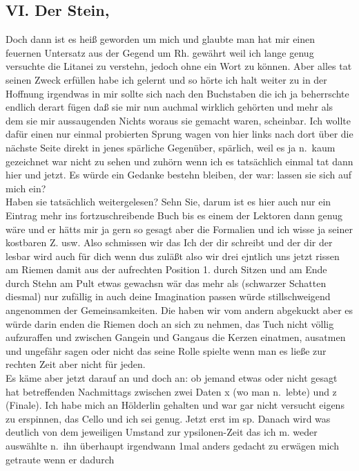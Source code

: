 \documentclass[
]{article}
\author{}
\date{\vspace{-2.5em}}
\begin{document}
\subsection{VI. Der Stein,}\label{vi.-der-stein}

Doch dann ist es heiß geworden um mich und glaubte man hat mir einen
feuernen Untersatz aus der Gegend um Rh. gewährt weil ich lange genug
versuchte die Litanei zu verstehn, jedoch ohne ein Wort zu können. Aber
alles tat seinen Zweck erfüllen habe ich gelernt und so hörte ich halt
weiter zu in der Hoffnung irgendwas in mir sollte sich nach den
Buchstaben die ich ja beherrschte endlich derart fügen daß sie mir nun
auchmal wirklich gehörten und mehr als dem sie mir aussaugenden Nichts
woraus sie gemacht waren, scheinbar. Ich wollte dafür einen nur einmal
probierten Sprung wagen von hier links nach dort über die nächste Seite
direkt in jenes spärliche Gegenüber, spärlich, weil es ja n.~kaum
gezeichnet war nicht zu sehen und zuhörn wenn ich es tatsächlich einmal
tat dann hier und jetzt. Es würde ein Gedanke bestehn bleiben, der war:
lassen sie sich auf mich ein?\\
Haben sie tatsächlich weitergelesen? Sehn Sie, darum ist es hier auch
nur ein Eintrag mehr ins fortzuschreibende Buch bis es einem der
Lektoren dann genug wäre und er hätts mir ja gern so gesagt aber die
Formalien und ich wisse ja seiner kostbaren Z. usw. Also schmissen wir
das Ich der dir schreibt und der dir der lesbar wird auch für dich wenn
dus zuläßt also wir drei ejntlich uns jetzt rissen am Riemen damit aus
der aufrechten Position 1. durch Sitzen und am Ende durch Stehn am Pult
etwas gewachsn wär das mehr als (schwarzer Schatten diesmal) nur
zufällig in auch deine Imagination passen würde stillschweigend
angenommen der Gemeinsamkeiten. Die haben wir vom andern abgekuckt aber
es würde darin enden die Riemen doch an sich zu nehmen, das Tuch nicht
völlig aufzuraffen und zwischen Gangein und Gangaus die Kerzen einatmen,
ausatmen und ungefähr sagen oder nicht das seine Rolle spielte wenn man
es ließe zur rechten Zeit aber nicht für jeden.\\
Es käme aber jetzt darauf an und doch an: ob jemand etwas oder nicht
gesagt hat betreffenden Nachmittags zwischen zwei Daten x (wo man
n.~lebte) und z (Finale). Ich habe mich an Hölderlin gehalten und war
gar nicht versucht eigens zu erspinnen, das Cello und ich sei genug.
Jetzt erst im sp. Danach wird was deutlich von dem jeweiligen Umstand
zur ypsilonen-Zeit das ich m. weder auswählte n.~ihn überhaupt
irgendwann 1mal anders gedacht zu erwägen mich getraute wenn er dadurch
\end{document}
